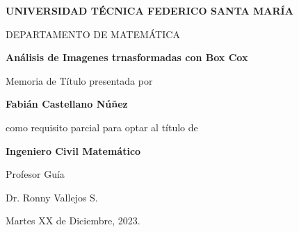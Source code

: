 \thispagestyle{empty}

\begin{center}
\large \textbf{UNIVERSIDAD T\'ECNICA FEDERICO SANTA MAR\'IA}

\vspace{3mm}

\normalsize DEPARTAMENTO DE MATEM\'ATICA
\vspace{35mm}

\Large {\bf An\'alisis de Imagenes trnasformadas con Box Cox}

\vspace{35mm}

\normalsize Memoria de T\'itulo presentada por

\vspace{2mm}

\large{\textbf{Fabi\'an Castellano N\'u\~nez}}

\vspace{10mm}

\normalsize como requisito parcial para optar al t\'itulo de

\vspace{2mm}

\textbf{Ingeniero Civil Matem\'atico}

\vspace{15mm}

Profesor Gu\'ia

\vspace{2mm}

Dr. Ronny Vallejos S.

\vspace{5mm}

Martes XX de Diciembre, 2023.

\end{center}